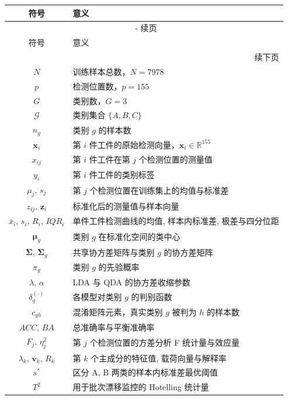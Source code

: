 \documentclass[12pt,a4paper]{article}
\renewcommand{\thetable}{\arabic{section}-\arabic{table}}
\begin{document}
\begin{longtable}{cl}
    \toprule
    符号 & 意义 \\
    \midrule
    \endfirsthead
    \multicolumn{2}{c}{{\tablename\ \thetable{} 续页}} \\
    \toprule
    符号 & 意义 \\
    \midrule
    \endhead
    \midrule
    \multicolumn{2}{r}{{续下页}} \\
    \endfoot
    \bottomrule
    \endlastfoot
    $N$ & 训练样本总数，$N=7978$ \\
    $p$ & 检测位置数，$p=155$ \\
    $G$ & 类别数，$G=3$ \\
    $\mathcal{G}$ & 类别集合 $\{A,B,C\}$ \\
    $n_g$ & 类别 $g$ 的样本数 \\
    $\mathbf{x}_i$ & 第 $i$ 件工件的原始检测向量，$\mathbf{x}_i\in\mathbb{R}^{155}$ \\
    $x_{ij}$ & 第 $i$ 件工件在第 $j$ 个检测位置的测量值 \\
    $y_i$ & 第 $i$ 件工件的类别标签 \\
    $\mu_j,\,s_j$ & 第 $j$ 个检测位置在训练集上的均值与标准差 \\
    $z_{ij},\,\mathbf{z}_i$ & 标准化后的测量值与样本向量 \\
    $\bar{x}_i,\,s_i,\,R_i,\,IQR_i$ & 单件工件检测曲线的均值, 样本内标准差, 极差与四分位距 \\
    $\boldsymbol{\mu}_g$ & 类别 $g$ 在标准化空间的类中心 \\
    $\boldsymbol{\Sigma},\,\boldsymbol{\Sigma}_g$ & 共享协方差矩阵与类别 $g$ 的协方差矩阵 \\
    $\pi_g$ & 类别 $g$ 的先验概率 \\
    $\lambda,\,\alpha$ & LDA 与 QDA 的协方差收缩参数 \\
    $\delta_g^{(\cdot)}$ & 各模型对类别 $g$ 的判别函数 \\
    $c_{gh}$ & 混淆矩阵元素，真实类别 $g$ 被判为 $h$ 的样本数 \\
    $ACC,\,BA$ & 总准确率与平衡准确率 \\
    $F_j,\,\eta_j^2$ & 第 $j$ 个检测位置的方差分析 F 统计量与效应量 \\
    $\lambda_k,\,\mathbf{v}_k,\,R_k$ & 第 $k$ 个主成分的特征值, 载荷向量与解释率 \\
    $s^{*}$ & 区分 A, B 两类的样本内标准差最优阈值 \\
    $T^2$ & 用于批次漂移监控的 Hotelling 统计量 \\
\end{longtable}
\end{document}
